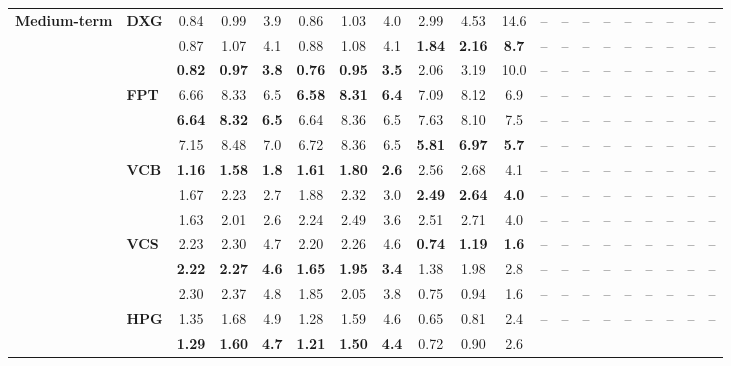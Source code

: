 \begin{table}[!t]
\begin{tabular*}{\textwidth}{@{\extracolsep{\fill}}llccc|ccc|ccc|ccc|ccc|ccc@{}}
\multirow{12}{*}{\textbf{Medium-term}}
& \multirow{3}{*}{\textbf{DXG}} 
  & 0.84 & 0.99 & 3.9 & 0.86 & 1.03 & 4.0 & 2.99 & 4.53 & 14.6
  & -- & -- & -- & -- & -- & -- & -- & -- & -- \\
& 
  & 0.87 & 1.07 & 4.1 & 0.88 & 1.08 & 4.1 & \textbf{1.84} & \textbf{2.16} & \textbf{8.7}
  & -- & -- & -- & -- & -- & -- & -- & -- & -- \\
& 
  & \textbf{0.82} & \textbf{0.97} & \textbf{3.8} & \textbf{0.76} & \textbf{0.95} & \textbf{3.5} & 2.06 & 3.19 & 10.0
  & -- & -- & -- & -- & -- & -- & -- & -- & -- \\
& \multirow{3}{*}{\textbf{FPT}} 
  & 6.66 & 8.33 & 6.5 & \textbf{6.58} & \textbf{8.31} & \textbf{6.4} & 7.09 & 8.12 & 6.9
  & -- & -- & -- & -- & -- & -- & -- & -- & -- \\
& 
  & \textbf{6.64} & \textbf{8.32} & \textbf{6.5} & 6.64 & 8.36 & 6.5 & 7.63 & 8.10 & 7.5
  & -- & -- & -- & -- & -- & -- & -- & -- & -- \\
& 
  & 7.15 & 8.48 & 7.0 & 6.72 & 8.36 & 6.5 & \textbf{5.81} & \textbf{6.97} & \textbf{5.7}
  & -- & -- & -- & -- & -- & -- & -- & -- & -- \\
& \multirow{3}{*}{\textbf{VCB}} 
  & \textbf{1.16} & \textbf{1.58} & \textbf{1.8} & \textbf{1.61} & \textbf{1.80} & \textbf{2.6} & 2.56 & 2.68 & 4.1
  & -- & -- & -- & -- & -- & -- & -- & -- & -- \\
& 
  & 1.67 & 2.23 & 2.7 & 1.88 & 2.32 & 3.0 & \textbf{2.49} & \textbf{2.64} & \textbf{4.0}
  & -- & -- & -- & -- & -- & -- & -- & -- & -- \\
& 
  & 1.63 & 2.01 & 2.6 & 2.24 & 2.49 & 3.6 & 2.51 & 2.71 & 4.0
  & -- & -- & -- & -- & -- & -- & -- & -- & -- \\
& \multirow{3}{*}{\textbf{VCS}} 
  & 2.23 & 2.30 & 4.7 & 2.20 & 2.26 & 4.6 & \textbf{0.74} & \textbf{1.19} & \textbf{1.6}
  & -- & -- & -- & -- & -- & -- & -- & -- & -- \\
& 
  & \textbf{2.22} & \textbf{2.27} & \textbf{4.6} & \textbf{1.65} & \textbf{1.95} & \textbf{3.4} & 1.38 & 1.98 & 2.8
  & -- & -- & -- & -- & -- & -- & -- & -- & -- \\
& 
  & 2.30 & 2.37 & 4.8 & 1.85 & 2.05 & 3.8 & 0.75 & 0.94 & 1.6
  & -- & -- & -- & -- & -- & -- & -- & -- & -- \\
& \multirow{3}{*}{\textbf{HPG}} 
  & 1.35 & 1.68 & 4.9 & 1.28 & 1.59 & 4.6 & 0.65 & 0.81 & 2.4
  & -- & -- & -- & -- & -- & -- & -- & -- & -- \\
& 
  & \textbf{1.29} & \textbf{1.60} & \textbf{4.7} & \textbf{1.21} & \textbf{1.50} & \textbf{4.4} & 0.72 & 0.90 & 2.6

\end{tabular*}
\end{table}
